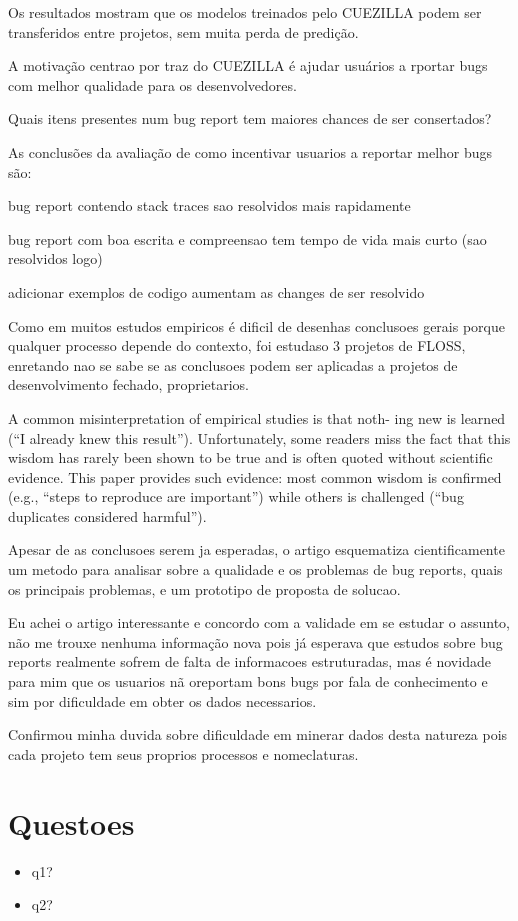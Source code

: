 \documentclass[12pt]{article}
\begin{document}
Os resultados mostram que os modelos treinados pelo CUEZILLA podem ser transferidos entre projetos, sem muita perda de predição.

A motivação centrao por traz do CUEZILLA é ajudar usuários a rportar bugs com melhor qualidade para os desenvolvedores.

Quais itens presentes num bug report tem maiores chances de ser consertados?

As conclusões da avaliação de como incentivar usuarios a reportar melhor bugs são:

bug report contendo stack traces sao resolvidos mais rapidamente

bug report com boa escrita e compreensao tem tempo de vida mais curto (sao resolvidos logo)

adicionar exemplos de codigo aumentam as changes de ser resolvido

Como em muitos estudos empiricos é dificil de desenhas conclusoes gerais porque qualquer processo depende do contexto, foi estudaso 3 projetos de FLOSS, enretando nao se sabe se as conclusoes podem ser aplicadas a projetos de desenvolvimento fechado, proprietarios.

A common misinterpretation of empirical studies is that noth-
ing new is learned (“I already knew this result”). Unfortunately,
some readers miss the fact that this wisdom has rarely been shown
to be true and is often quoted without scientific evidence. This
paper provides such evidence: most common wisdom is confirmed
(e.g., “steps to reproduce are important”) while others is challenged
(“bug duplicates considered harmful”).

Apesar de as conclusoes serem ja esperadas, o artigo esquematiza cientificamente um metodo para analisar sobre a qualidade e os problemas de bug reports, quais os principais problemas, e um prototipo de proposta de solucao.

Eu achei o artigo interessante e concordo com a validade em se estudar o assunto, não me trouxe nenhuma informação nova pois já esperava que estudos sobre bug reports realmente sofrem de falta de informacoes estruturadas, mas é novidade para mim que os usuarios nã oreportam bons bugs por fala de conhecimento e sim por dificuldade em obter os dados necessarios.

Confirmou minha duvida sobre dificuldade em minerar dados desta natureza pois cada projeto tem seus proprios processos e nomeclaturas.

\section*{Questoes}

\begin{itemize}
  \item q1?
  \item q2?
\end{itemize}


\end{document}
